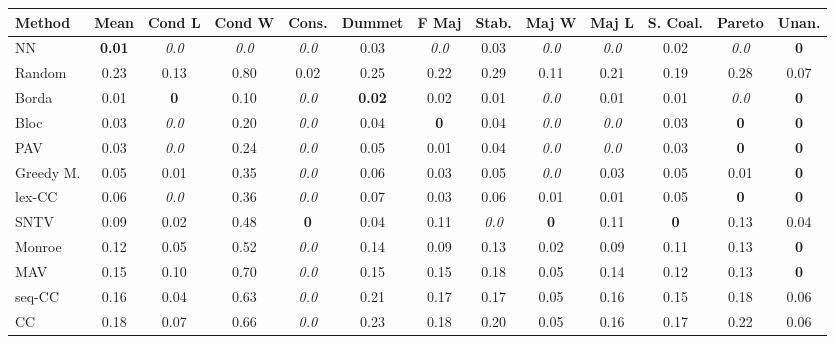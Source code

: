 \begin{tabular}{lcccccccccccc}
\toprule
Method & Mean & Cond L & Cond W & Cons. & Dummet & F Maj & Stab. & Maj W & Maj L & S. Coal. & Pareto & Unan. \\
\midrule
NN & \textbf{0.01} & \textit{0.0} & \textit{0.0} & \textit{0.0} & 0.03 & \textit{0.0} & 0.03 & \textit{0.0} & \textit{0.0} & 0.02 & \textit{0.0} & \textbf{0} \\
Random & 0.23 & 0.13 & 0.80 & 0.02 & 0.25 & 0.22 & 0.29 & 0.11 & 0.21 & 0.19 & 0.28 & 0.07 \\
Borda & 0.01 & \textbf{0} & 0.10 & \textit{0.0} & \textbf{0.02} & 0.02 & 0.01 & \textit{0.0} & 0.01 & 0.01 & \textit{0.0} & \cellcolor{green!25}\textbf{0} \\
Bloc & 0.03 & \textit{0.0} & 0.20 & \textit{0.0} & 0.04 & \textbf{0} & 0.04 & \textit{0.0} & \textit{0.0} & 0.03 & \textbf{0} & \textbf{0} \\
PAV & 0.03 & \textit{0.0} & 0.24 & \textit{0.0} & 0.05 & 0.01 & 0.04 & \textit{0.0} & \textit{0.0} & 0.03 & \cellcolor{green!25}\textbf{0} & \textbf{0} \\
Greedy M. & 0.05 & 0.01 & 0.35 & \textit{0.0} & 0.06 & 0.03 & 0.05 & \textit{0.0} & 0.03 & 0.05 & 0.01 & \textbf{0} \\
lex-CC & 0.06 & \textit{0.0} & 0.36 & \textit{0.0} & 0.07 & 0.03 & 0.06 & 0.01 & 0.01 & 0.05 & \textbf{0} & \textbf{0} \\
SNTV & 0.09 & 0.02 & 0.48 & \textbf{0} & 0.04 & 0.11 & \textit{0.0} & \textbf{0} & 0.11 & \textbf{0} & 0.13 & 0.04 \\
Monroe & 0.12 & 0.05 & 0.52 & \cellcolor{green!25}\textit{0.0} & 0.14 & 0.09 & 0.13 & 0.02 & 0.09 & 0.11 & 0.13 & \cellcolor{green!25}\textbf{0} \\
MAV & 0.15 & 0.10 & 0.70 & \textit{0.0} & 0.15 & 0.15 & 0.18 & 0.05 & 0.14 & 0.12 & 0.13 & \textbf{0} \\
seq-CC & 0.16 & 0.04 & 0.63 & \textit{0.0} & 0.21 & 0.17 & 0.17 & 0.05 & 0.16 & 0.15 & 0.18 & 0.06 \\
CC & 0.18 & 0.07 & 0.66 & \cellcolor{green!25}\textit{0.0} & 0.23 & 0.18 & 0.20 & 0.05 & 0.16 & 0.17 & 0.22 & 0.06 \\
\bottomrule
\end{tabular}

